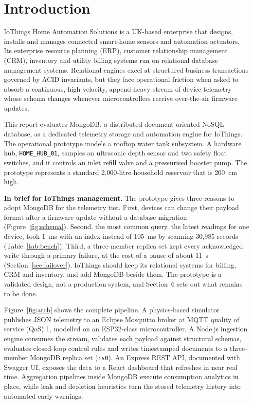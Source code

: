 \documentclass[11pt,a4paper]{article}
\begin{document}
\tableofcontents
\clearpage
\listoffigures
\listoftables
\clearpage
{}

\section{Introduction}

IoThings Home Automation Solutions is a UK-based enterprise that designs, installs and manages connected smart-home sensors and automation actuators. Its enterprise resource planning (ERP), customer relationship management (CRM), inventory and utility billing systems run on relational database management systems. Relational engines excel at structured business transactions governed by ACID invariants, but they face operational friction when asked to absorb a continuous, high-velocity, append-heavy stream of device telemetry whose schema changes whenever microcontrollers receive over-the-air firmware updates.

This report evaluates MongoDB, a distributed document-oriented NoSQL database, as a dedicated telemetry storage and automation engine for IoThings. The operational prototype models a rooftop water tank subsystem. A hardware hub, \texttt{HOME\_HUB\_01}, samples an ultrasonic depth sensor and two safety float switches, and it controls an inlet refill valve and a pressurised booster pump. The prototype represents a standard 2,000-litre household reservoir that is 200~cm high.

\textbf{In brief for IoThings management.} The prototype gives three reasons to adopt MongoDB for the telemetry tier. First, devices can change their payload format after a firmware update without a database migration (Figure~\ref{fig:schema}). Second, the most common query, the latest readings for one device, took 1~ms with an index instead of 105~ms by scanning 30,985 records (Table~\ref{tab:bench}). Third, a three-member replica set kept every acknowledged write through a primary failure, at the cost of a pause of about 11~s (Section~\ref{sec:failover}). IoThings should keep its relational systems for billing, CRM and inventory, and add MongoDB beside them. The prototype is a validated design, not a production system, and Section~6 sets out what remains to be done.

Figure~\ref{fig:arch} shows the complete pipeline. A physics-based simulator publishes JSON telemetry to an Eclipse Mosquitto broker at MQTT quality of service (QoS) 1, modelled on an ESP32-class microcontroller. A Node.js ingestion engine consumes the stream, validates each payload against structural schemas, evaluates closed-loop control rules and writes timestamped documents to a three-member MongoDB replica set (\texttt{rs0}). An Express REST API, documented with Swagger UI, exposes the data to a React dashboard that refreshes in near real time. Aggregation pipelines inside MongoDB execute consumption analytics in place, while leak and depletion heuristics turn the stored telemetry history into automated early warnings.
\end{document}
